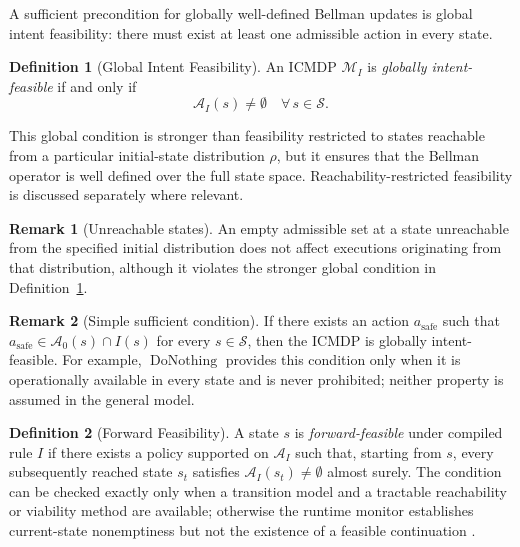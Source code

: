 \documentclass[journal]{IEEEtran}
\theoremstyle{definition}
\newtheorem{definition}{Definition}[section]
\newtheorem{remark}{Remark}[section]
\newcommand{\cS}{\mathcal{S}}
\newcommand{\cA}{\mathcal{A}}
\newcommand{\cM}{\mathcal{M}}
\begin{document}
A sufficient precondition for globally well-defined Bellman updates is
global intent feasibility:
there must exist at least one admissible action in
every state.


\begin{definition}[Global Intent Feasibility]
\label{def:feasibility}
An ICMDP $\cM_I$ is \emph{globally
intent-feasible} if and only if
\begin{equation}
  \cA_I(s) \neq \emptyset \quad \forall\, s \in \cS.
  \label{eq:feasibility}
\end{equation}
\end{definition}

This global condition is stronger than feasibility restricted to states
reachable from a particular initial-state distribution $\rho$, but it ensures
that the Bellman operator is well defined over the full state space.
Reachability-restricted feasibility is discussed separately where relevant.

\begin{remark}[Unreachable states]
An empty admissible set at a state unreachable from the specified
initial distribution does not affect executions originating from that
distribution, although it violates the stronger global condition in
Definition~\ref{def:feasibility}.
\end{remark}

\begin{remark}[Simple sufficient condition]
If there exists an action $a_{\mathrm{safe}}$ such that
$a_{\mathrm{safe}}\in\cA_0(s)\cap I(s)$ for every $s\in\cS$, then the ICMDP is
globally intent-feasible. For example, $\operatorname{DoNothing}$ provides this
condition only when it is operationally available in every state and is never
prohibited; neither property is assumed in the general model.
\end{remark}

\begin{definition}[Forward Feasibility]
\label{def:forward_feasibility}
A state $s$ is \emph{forward-feasible} under compiled rule $I$ if there exists
a policy supported on $\cA_I$ such that, starting from $s$, every subsequently
reached state $s_t$ satisfies $\cA_I(s_t)\neq\emptyset$ almost surely. The
condition can be checked exactly only when a transition model and a tractable
reachability or viability method are available; otherwise the runtime monitor
establishes current-state nonemptiness but not the existence of a feasible
continuation \citep{yu2022reachability}.
\end{definition}
\end{document}
